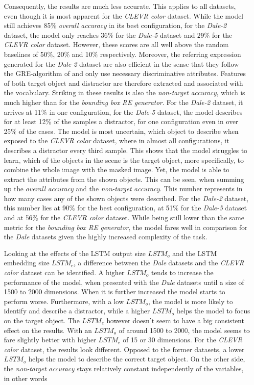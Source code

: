Consequently, the results are much less accurate.
This applies to all datasets, even though it is most apparent for the \emph{CLEVR color} dataset.
While the model still achieves 85\% \emph{overall accuracy} in its best configuration, for the \emph{Dale-2} dataset, the model only reaches 36\% for the \emph{Dale-5} dataset and 29\% for the \emph{CLEVR color} dataset.
However, these scores are all well above the random baselines of 50\%, 20\% and 10\% respectively.
Moreover, the referring expression generated for the \emph{Dale-2} dataset are also efficient in the sense that they follow the GRE-algorithm of \citet{Dale1995} and only use necessary discriminative attributes.
Features of both target object and distractor are therefore extracted and associated with the vocabulary.
Striking in these results is also the \emph{non-target accuracy}, which is much higher than for the \emph{bounding box RE generator}.
For the \emph{Dale-2} dataset, it arrives at 11\% in one configuration, for the \emph{Dale-5} dataset, the model describes for at least 12\% of the samples a distractor, for one configuration even in over 25\% of the cases.
The model is most uncertain, which object to describe when exposed to the \emph{CLEVR color} dataset, where in almost all configurations, it describes a distractor every third sample.
This shows that the model struggles to learn, which of the objects in the scene is the target object, more specifically, to combine the whole image with the masked image.
Yet, the model is able to extract the attributes from the shown objects.
This can be seen, when summing up the \emph{overall accuracy} and the \emph{non-target accuracy}.
This number represents in how many cases any of the shown objects were described.
For the \emph{Dale-2} dataset, this number lies at 90\% for the best configuration, at 51\% for the \emph{Dale-5} dataset and at 56\% for the \emph{CLEVR color} dataset.
While being still lower than the same metric for the \emph{bounding box RE generator}, the model fares well in comparison for the \emph{Dale} datasets given the highly increased complexity of the task.

Looking at the effects of the LSTM output size $LSTM_o$ and the LSTM embedding size $LSTM_e$, a difference between the \emph{Dale} datasets and the \emph{CLEVR color} dataset can be identified.
A higher $LSTM_o$ tends to increase the performance of the model, when presented with the \emph{Dale} datasets until a size of 1500 to 2000 dimensions.
When it is further increased the model starts to perform worse.
Furthermore, with a low $LSTM_o$, the model is more likely to identify and describe a distractor, while a higher $LSTM_o$ helps the model to focus on the target object.
The $LSTM_e$ however doesn't seem to have a big consistent effect on the results. With an $LSTM_o$ of around 1500 to 2000, the model seems to fare slightly better with higher $LSTM_e$ of 15 or 30 dimensions.
For the \emph{CLEVR color} dataset, the results look different.
Opposed to the former datasets, a lower $LSTM_o$ helps the model to describe the correct target object.
On the other side, the \emph{non-target accuracy} stays relatively constant independently of the variables, in other words


